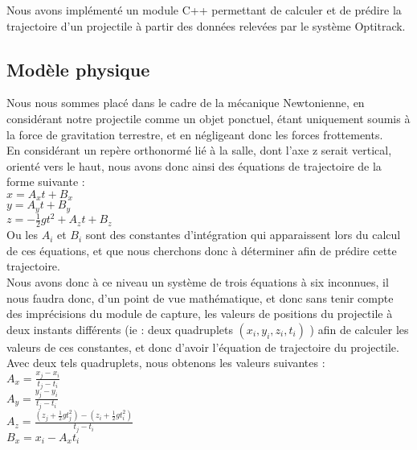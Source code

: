 Nous avons implémenté un module C++ permettant de calculer et de prédire la trajectoire d'un projectile à partir des données relevées par le système Optitrack.

\subsection{Modèle physique}

Nous nous sommes placé dans le cadre de la mécanique Newtonienne, en considérant notre projectile comme un objet ponctuel, étant uniquement soumis à la force de gravitation terrestre, et en négligeant donc les forces frottements.\\

En considérant un repère orthonormé lié à la salle, dont l'axe z serait vertical, orienté vers le haut, nous avons donc ainsi des équations de trajectoire de la forme suivante :\\

$x = A_xt + B_x$\\

$y = A_yt + B_y$\\

$z = -\frac{1}{2} g t^2 + A_zt + B_z$\\

Ou les $A_i$ et $B_i$ sont des constantes d'intégration qui apparaissent lors du calcul de ces équations, et que nous cherchons donc à déterminer afin de prédire cette trajectoire.\\

Nous avons donc à ce niveau un système de trois équations à six inconnues, il nous faudra donc, d'un point de vue mathématique, et donc sans tenir compte des imprécisions du module de capture, les valeurs de positions du projectile à deux instants différents (ie : deux quadruplets $(x_i, y_i, z_i, t_i)$ ) afin de calculer les valeurs de ces constantes, et donc d'avoir l'équation de trajectoire du projectile.
\newpage
Avec deux tels quadruplets, nous obtenons les valeurs suivantes :\\

$A_x = \frac{x_j-x_i}{t_j-t_i}$\\

$A_y = \frac{y_j-y_i}{t_j-t_i}$\\

$A_z = \frac{(z_j + \frac{1}{2} g t_j^2)-(z_i + \frac{1}{2} g t_i^2)}{t_j-t_i}$\\

$B_x = x_i - A_x t_i$\\

